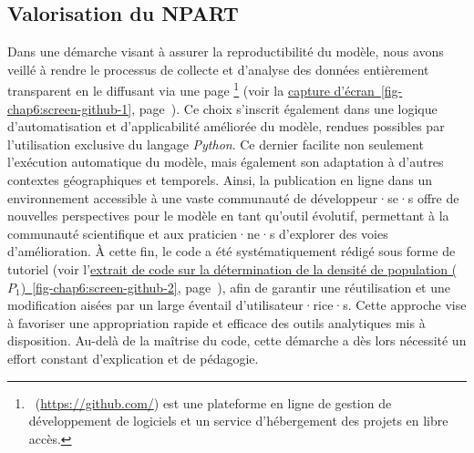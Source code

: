 \begin{refsegment}
\subsection*{Valorisation du \acrshort{NPART}
    \label{chap6:conclusion-valorisation}
    }

Dans une démarche visant à assurer la reproductibilité du modèle, nous avons veillé à rendre le processus de collecte et d’analyse des données entièrement transparent en le diffusant via une page \footnote{
    ~(\url{https://github.com/}) est une plateforme en ligne de gestion de développement de logiciels et un service d'hébergement des projets en libre accès.
} (voir la \hyperref[fig-chap6:screen-github-1]{capture d'écran~\ref{fig-chap6:screen-github-1}}, page~\pageref{fig-chap6:screen-github-1}). Ce choix s’inscrit également dans une logique d’automatisation et d’applicabilité améliorée du modèle, rendues possibles par l’utilisation exclusive du langage \textsl{Python}. Ce dernier facilite non seulement l’exécution automatique du modèle, mais également son adaptation à d’autres contextes géographiques et temporels.  Ainsi, la publication en ligne dans un environnement accessible à une vaste communauté de développeur·se·s offre de nouvelles perspectives pour le modèle en tant qu’outil évolutif, permettant à la communauté scientifique et aux praticien·ne·s d’explorer des voies d’amélioration. À cette fin, le code a été systématiquement rédigé sous forme de tutoriel (voir l'\hyperref[fig-chap6:screen-github-2]{extrait de code sur la détermination de la densité de population (\(P_{1}\))~\ref{fig-chap6:screen-github-2}}, page~\pageref{fig-chap6:screen-github-2}), afin de garantir une réutilisation et une modification aisées par un large éventail d’utilisateur·rice·s. Cette approche vise à favoriser une appropriation rapide et efficace des outils analytiques mis à disposition. Au-delà de la maîtrise du code, cette démarche a dès lors nécessité un effort constant d’explication et de pédagogie.%

    \bigskip
    \begin{tcolorbox}[colback=white!5!white,
                      colframe=blue!75!blue,
                      title=
                      \bigskip
                      \center{Dépôt \Marque{GitHub} du modèle \textsl{Node Place Accessibility Ridership per Time}}
                      \bigskip]
    \end{tcolorbox}
    \bigskip


\end{refsegment}
